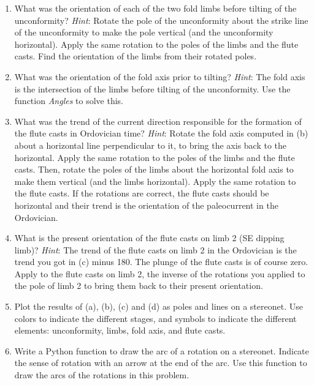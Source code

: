 \documentclass[a4paper , 12pt]{book}
\begin{document}
\begin{enumerate}
    \begin{enumerate}
        \item What was the orientation of each of the two fold limbs before tilting of the unconformity? \textit{Hint}: Rotate the pole of the unconformity about the strike line of the unconformity to make the pole vertical (and the unconformity horizontal). Apply the same rotation to the poles of the limbs and the flute casts. Find the orientation of the limbs from their rotated poles.
        \item What was the orientation of the fold axis prior to tilting? \textit{Hint}: The fold axis is the intersection of the limbs before tilting of the unconformity. Use the function \textit{Angles} to solve this. 
        \item What was the trend of the current direction responsible for the formation of the flute casts in Ordovician time? \textit{Hint}: Rotate the fold axis computed in (b) about a horizontal line perpendicular to it, to bring the axis back to the horizontal. Apply the same rotation to the poles of the limbs and the flute casts. Then, rotate the poles of the limbs about the horizontal fold axis to make them vertical (and the limbs horizontal). Apply the same rotation to the flute casts. If the rotations are correct, the flute casts should be horizontal and their trend is the orientation of the paleocurrent in the Ordovician.
        \item What is the present orientation of the flute casts on limb 2 (SE dipping limb)? \textit{Hint}: The trend of the flute casts on limb 2 in the Ordovician is the trend you got in (c) minus 180\degree. The plunge of the flute casts is of course zero. Apply to the flute casts on limb 2, the inverse of the rotations you applied to the pole of limb 2 to bring them back to their present orientation.
        \item Plot the results of (a), (b), (c) and (d) as poles and lines on a stereonet. Use colors to indicate the different stages, and symbols to indicate the different elements: unconformity, limbs, fold axis, and flute casts. 
        \item Write a Python function to draw the arc of a rotation on a stereonet. Indicate the sense of rotation with an arrow at the end of the arc. Use this function to draw the arcs of the rotations in this problem.
    \end{enumerate}{}
    
\end{enumerate}
\end{document}
